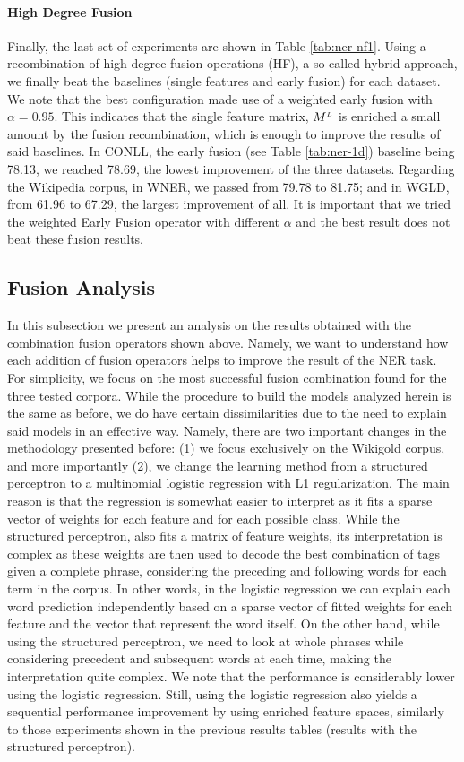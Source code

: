            
           
\paragraph{High Degree Fusion}
Finally, the last set of experiments are shown in Table \ref{tab:ner-nf1}. Using a recombination of high degree fusion operations (HF), a so-called hybrid approach, we finally beat the baselines (single features and early fusion) for each dataset. We note that the best configuration made use of a weighted early fusion with $\alpha=0.95$. This indicates that the single feature matrix, $M^{\scriptscriptstyle L}$ is enriched a small amount by the fusion recombination, which is enough to improve the results of said baselines. In CONLL, the early fusion (see Table \ref{tab:ner-1d}) baseline being 78.13, we reached 78.69, the lowest improvement of the three datasets. Regarding the Wikipedia corpus, in WNER, we passed from 79.78 to 81.75; and in WGLD, from 61.96 to 67.29, the largest improvement of all. It is important that we tried the weighted Early Fusion operator with different $\alpha$ and the best result does not beat these fusion results.

\subsection{Fusion Analysis}
In this subsection we present an analysis on the results obtained with the combination fusion operators shown  above. Namely, we want to understand how each addition of fusion operators helps to improve the result of the NER task. For simplicity,  we focus on the most successful fusion combination found for the three tested corpora. While the procedure to build the models analyzed herein is the same as before, we do have certain dissimilarities due to the need to explain said models in an effective way. Namely, there are two important changes in the methodology presented before: (1) we focus exclusively on the Wikigold corpus, and more importantly (2), we change the learning method from a structured perceptron to a multinomial logistic regression with L1 regularization. The main reason is that the regression is somewhat easier to interpret as it fits a sparse vector of weights for each feature and for each possible class. While the structured perceptron, also fits a matrix of feature weights, its interpretation is complex as these weights are then used to decode the best combination of tags given a complete phrase, considering the preceding and following words for each term in the corpus. In other words, in the logistic regression we can explain each word prediction independently based on a sparse vector of fitted weights for each feature and the vector that represent the word itself. On the other hand, while using the structured perceptron, we need to look at whole phrases  while considering precedent and subsequent words at each time, making the interpretation quite complex. We note that the performance is considerably lower using the logistic regression. Still, using the logistic regression also yields a sequential performance improvement  by using enriched feature spaces, similarly to those experiments shown in the previous results tables (results with the structured perceptron).

